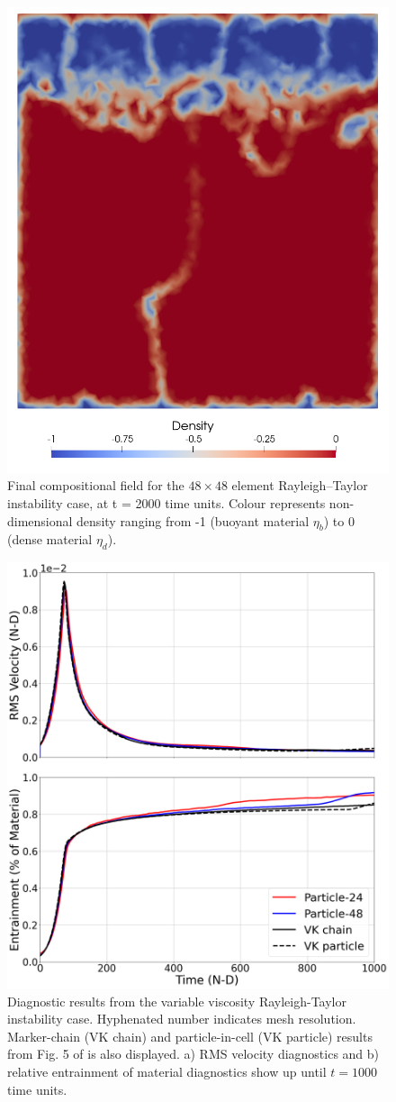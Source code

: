 \begin{figure}[t]
	\centering
	      \includegraphics[width=0.60\columnwidth]{./examples_images/particle_rayleigh_taylor_mu10/Final_materials.png}
   \caption{Final compositional field for the $48 \times 48$ element Rayleigh--Taylor instability case, at t = 2000 time units. Colour represents non-dimensional density ranging from -1 (buoyant material $\eta_{b}$) to 0 (dense material $\eta_{d}$).}
   \label{fig:rayleigh_taylor_materials}
\end{figure}

\begin{figure}[t]
	\centering
	      \includegraphics[width=0.70\columnwidth]{./examples_images/particle_rayleigh_taylor_mu10/Graphs.png}
   \caption{Diagnostic results from the variable viscosity Rayleigh-Taylor instability case. Hyphenated number indicates mesh resolution. Marker-chain (VK chain) and particle-in-cell (VK particle) results from Fig. 5 of \citet{vankeken1997comparison} is also displayed. a) RMS velocity diagnostics and b) relative entrainment of material diagnostics show up until $t=1000$ time units.}
   \label{fig:rayleigh_taylor_graphs}
\end{figure}


